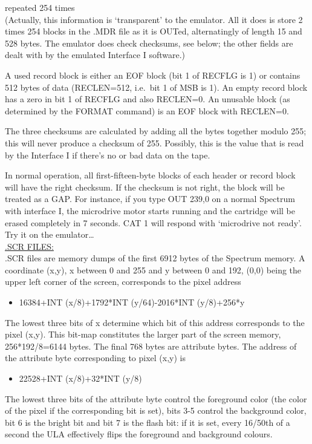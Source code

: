     repeated 254 times\\

\noindent
    (Actually, this information is `transparent' to the emulator.  All it
    does is store 2 times 254 blocks in the .MDR file as it is OUTed,
    alternatingly of length 15 and 528 bytes.  The emulator does check
    checksums, see below; the other fields are dealt with by the emulated
    Interface I software.)

    A used record block is either an EOF block (bit 1 of RECFLG is 1) or
    contains 512 bytes of data (RECLEN=512, i.e.\  bit 1 of MSB is 1).  An
    empty record block has a zero in bit 1 of RECFLG and also RECLEN=0.  An
    unusable block (as determined by the FORMAT command) is an EOF block
    with RECLEN=0.

    The three checksums are calculated by adding all the bytes together
    modulo 255; this will never produce a checksum of 255.  Possibly, this
    is the value that is read by the Interface I if there's no or bad data
    on the tape.

    In normal operation, all first-fifteen-byte blocks of each header or
    record block will have the right checksum.  If the checksum is not
    right, the block will be treated as a GAP\@.  For instance, if you type
    OUT 239,0 on a normal Spectrum with interface I, the microdrive motor
    starts running and the cartridge will be erased completely in 7 seconds.
    CAT 1 will respond with `microdrive not ready'.  Try it on the
    emulator\ldots\\

\newpage
\noindent
\underline{.SCR FILES:}\\

\noindent
    .SCR files are memory dumps of the first 6912 bytes of the Spectrum
    memory.  A coordinate (x,y), x between 0 and 255 and y between 0 and
    192, (0,0) being the upper left corner of the screen, corresponds to the
    pixel address
\begin{itemize}
  \item[] 16384+INT (x/8)+1792*INT (y/64)-2016*INT (y/8)+256*y
\end{itemize}

\noindent
    The lowest three bits of x determine which bit of this address
    corresponds to the pixel (x,y).  This bit-map constitutes the larger
    part of the screen memory, 256*192/8=6144 bytes.  The final 768 bytes
    are attribute bytes.  The address of the attribute byte corresponding to
    pixel (x,y) is
\begin{itemize}
  \item[] 22528+INT (x/8)+32*INT (y/8)
\end{itemize}
    The lowest three bits of the attribute byte control the foreground color
    (the color of the pixel if the corresponding bit is set), bits 3-5
    control the background color, bit 6 is the bright bit and bit 7 is the
    flash bit: if it is set, every 16/50th of a second the ULA
    effectively flips the foreground and background colours.

